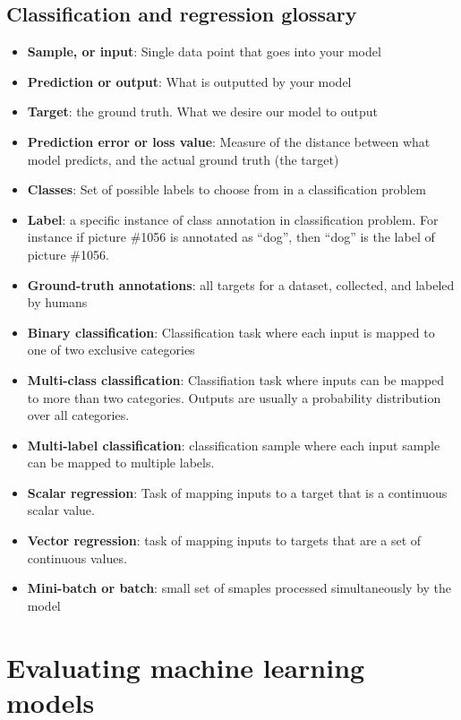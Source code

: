 \documentclass[12pt, a4paper]{article}
\begin{document}
\subsection{Classification and regression glossary}
\begin{itemize}
   \item \textbf{Sample, or input}: Single data point that goes into your model
   \item \textbf{Prediction or output}: What is outputted by your model
   \item \textbf{Target}: the ground truth. What we desire our model to output
   \item \textbf{Prediction error or loss value}:  Measure of the distance between
   what model predicts, and the actual ground truth (the target)
   \item \textbf{Classes}: Set of possible labels to choose from in a classification problem
   \item \textbf{Label}: a specific instance of class annotation in classification problem. For
   instance if picture \#1056 is annotated as ``dog'', then ``dog'' is the label of
   picture \#1056.
   \item \textbf{Ground-truth annotations}: all targets for a dataset, collected, and labeled by humans
   \item \textbf{Binary classification}: Classification task where each input is mapped to one of two
   exclusive categories
   \item \textbf{Multi-class classification}: Classifiation task where inputs can be mapped
   to more than two categories. Outputs are usually a probability distribution over all categories.
   \item \textbf{Multi-label classification}: classification sample where each
   input sample can be mapped to multiple labels.
   \item \textbf{Scalar regression}: Task of mapping inputs to a target that is a 
   continuous scalar value.
   \item \textbf{Vector regression}: task of mapping inputs to 
   targets that are a set of continuous values.
   \item \textbf{Mini-batch or batch}: small set of smaples processed simultaneously
   by the model
\end{itemize}

\newpage
\section{Evaluating machine learning models}
\end{document}
